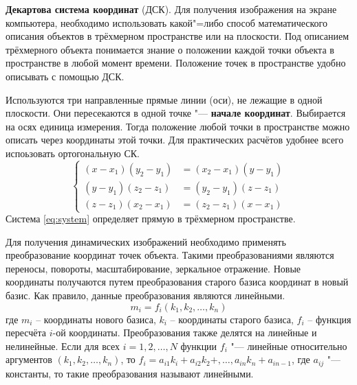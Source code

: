 \textbf{Декартова система координат} (ДСК). Для получения изображения на экране компьютера, необходимо использовать какой"=либо способ математического описания объектов в трёхмерном пространстве или на плоскости. Под описанием трёхмерного объекта понимается знание о положении каждой точки объекта в пространстве в любой момент времени. Положение точек в пространстве удобно описывать с помощью ДСК.

Используются три направленные прямые линии (оси), не лежащие в одной плоскости. Они пересекаются в одной точке "--- \textbf{начале координат}. Выбирается на осях единица измерения. Тогда положение любой точки в пространстве можно описать через координаты этой точки. Для практических расчётов удобнее всего испоьзовать ортогональную СК.
\begin{equation}\label{eq:system}
    \left\{
    \begin{aligned}
    (x - x_{1})(y_{2} - y_{1}) &= (x_{2} - x_{1})(y - y_{1}) \\
    (y - y_{1})(z_{2} - z_{1}) &= (y_{2} - y_{1})(z - z_{1}) \\
    (z - z_{1})(x_{2} - x_{1}) &= (z_{2} - z_{1})(x - x_{1})
    \end{aligned}
    \right.
\end{equation}
Система \ref{eq:system} определяет прямую в трёхмерном пространстве.

Для получения динамических изображений необходимо применять преобразование координат точек объекта. Такими преобразованиями являются переносы, повороты, масштабирование, зеркальное отражение. Новые координаты получаются путем преобразования старого базиса координат в новый базис. Как правило, данные преобразования являются линейными. 
\begin{equation}
    m_{i} = f_{i}(k_{1}, k_{2}, \ldots, k_{n})
\end{equation}
где $m_{i}$ – координаты нового базиса, $k_{i}$ – координаты старого базиса, $f_{i}$ – функция пересчёта $i$-ой координаты. Преобразования также делятся на линейные и нелинейные. Если для всех $i = 1, 2, \ldots, N$ функции $f_{i}$ "--- линейные относительно аргументов $(k_{1}, k_{2}, \ldots, k_{n})$, то $f_{i} = a_{i1}k_{i} + a_{i2}k_{2} +, \ldots, a_{in}k_{n} + a_{in-1}$, где $a_{ij}$ "--- константы, то такие преобразования называют линейными. 

